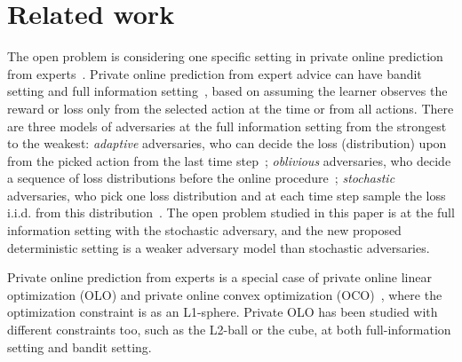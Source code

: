\section{Related work}
The open problem is considering one specific setting in private online prediction from experts~\citep{asi2023private}.
Private online prediction from expert advice can have bandit setting and full information setting~\citep{guha2013nearly}, based on assuming the learner observes the reward or loss only from the selected action at the time or from all actions.
There are three models of adversaries at the full information setting from the strongest to the weakest: \textit{adaptive} adversaries, who can decide the loss (distribution) upon from the picked action from the last time step~\citep{jain2012differentially, guha2013nearly, jain2014near, agarwal2017price, asi2023private}; \textit{oblivious} adversaries, who decide a sequence of loss distributions before the online procedure~\citep{asi2023private}; \textit{stochastic} adversaries, who pick one loss distribution and at each time step sample the loss i.i.d. from this distribution~\citep{kairouz2021practical, hu2021near, asi2023private}.
The open problem studied in this paper is at the full information setting with the stochastic adversary, and the new proposed deterministic setting is a weaker adversary model than stochastic adversaries.

Private online prediction from experts is a special case of private online linear optimization (OLO) and private online convex optimization (OCO)~\citep{guha2013nearly, agarwal2017price, kairouz2021practical, agarwal2023differentially,asi2023near, pmlr-v235-agarwal24d}, where the optimization constraint is as an L1-sphere.
Private OLO has been studied with different constraints too, such as the L2-ball or the cube, at both full-information setting and bandit setting.

%
